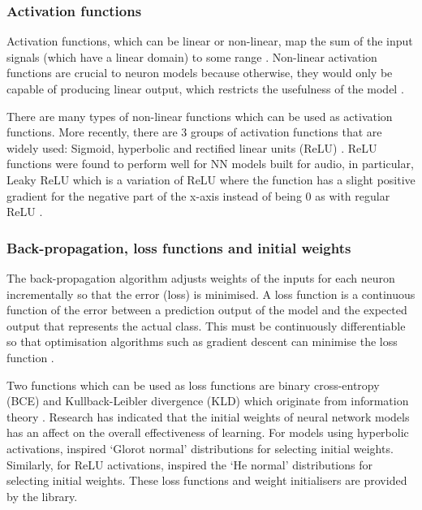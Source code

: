 \documentclass[12pt]{article}
\begin{document}
    \subsubsection{Activation functions}
    \label{sec:activation_functions}
    
    Activation functions, which can be linear or non-linear, map the sum of the input signals (which have a linear domain) to some range \parencite{Nwankpa2018}. Non-linear activation functions are crucial to neuron models because otherwise, they would only be capable of producing linear output, which restricts the usefulness of the model \parencite[p.567-568]{Russell;Norvig1995}.\medskip
    
    There are many types of non-linear functions which can be used as activation functions. More recently, there are 3 groups of activation functions that are widely used: Sigmoid, hyperbolic and rectified linear units (ReLU) \parencite{Nwankpa2018}. ReLU functions were found to perform well for NN models built for audio, in particular, Leaky ReLU which is a variation of ReLU where the function has a slight positive gradient for the negative part of the x-axis instead of being 0 as with regular ReLU \parencite{Maas2013}.\medskip
    
    \subsubsection{Back-propagation, loss functions and initial weights}
	\label{sec:backprop_and_loss}
	
	The back-propagation algorithm adjusts weights of the inputs for each neuron incrementally so that the error (loss) is minimised. A loss function is a continuous function of the error between a prediction output of the model and the expected output that represents the actual class. This must be continuously differentiable so that optimisation algorithms such as gradient descent can minimise the loss function \parencite[p.580-581]{Russell;Norvig1995}.\medskip
	
	Two functions which can be used as loss functions are binary cross-entropy (BCE) and Kullback-Leibler divergence (KLD) which originate from information theory \parencite[p.34, p.67]{MacKay2013}. Research has indicated that the initial weights of neural network models has an affect on the overall effectiveness of learning. For models using hyperbolic activations, \textcite{Glorot2010} inspired `Glorot normal' distributions for selecting initial weights. Similarly, for ReLU activations, \textcite{HeNorm2015} inspired the `He normal' distributions for selecting initial weights. These loss functions and weight initialisers are provided by the \textcite{Keras} library.\medskip
	
\end{document}
